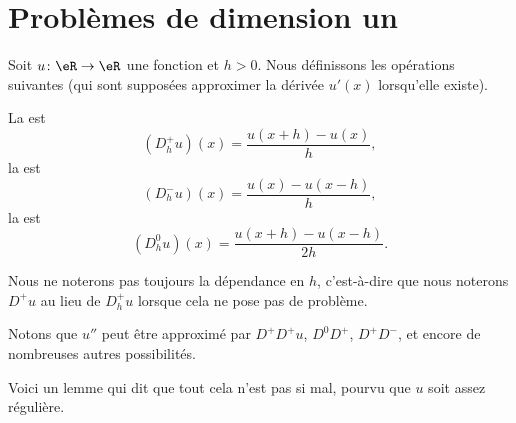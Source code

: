 
\section{Problèmes de dimension un}

Soit \( u\colon \eR\to \eR\) une fonction et \( h>0\). Nous définissons les opérations suivantes (qui sont supposées approximer la dérivée \( u'(x)\) lorsqu'elle existe).

\begin{definition}
	La  est
	\begin{equation}
		(D^+_hu)(x)=\frac{ u(x+h)-u(x) }{ h },
	\end{equation}
	la  est
	\begin{equation}
		(D^-_hu)(x)=\frac{ u(x)-u(x-h) }{ h },
	\end{equation}
	la  est
	\begin{equation}
		(D^0_hu)(x)=\frac{ u(x+h)-u(x-h) }{ 2h }.
	\end{equation}
\end{definition}
Nous ne noterons pas toujours la dépendance en \( h\), c'est-à-dire que nous noterons \( D^+u\) au lieu de \( D^+_hu\) lorsque cela ne pose pas de problème.

Notons que \( u''\) peut être approximé par \( D^+D^+u\), \( D^0D^+\), \( D^+D^-\), et encore de nombreuses autres possibilités.

Voici un lemme qui dit que tout cela n'est pas si mal, pourvu que \( u\) soit assez régulière.

